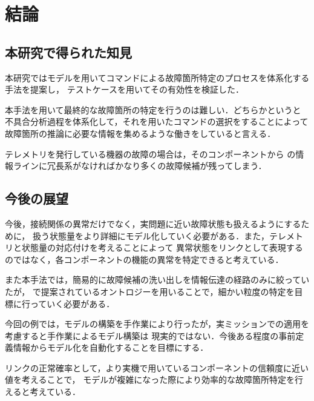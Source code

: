 \documentclass[11pt]{jsreport}
\begin{document}
\fi

\chapter{結論}

\section{本研究で得られた知見}%
本研究ではモデルを用いてコマンドによる故障箇所特定のプロセスを体系化する手法を提案し，
テストケースを用いてその有効性を検証した．

  本手法を用いて最終的な故障箇所の特定を行うのは難しい．どちらかというと
  不具合分析過程を体系化して，それを用いたコマンドの選択をすることによって
  故障箇所の推論に必要な情報を集めるような働きをしていると言える．

  テレメトリを発行している機器の故障の場合は，そのコンポーネントから
  の情報ラインに冗長系がなければかなり多くの故障候補が残ってしまう．

  \section{今後の展望}
 今後，接続関係の異常だけでなく，実問題に近い故障状態も扱えるようにするために，
 扱う状態量をより詳細にモデル化していく必要がある．また，テレメトリと状態量の対応付けを考えることによって
 異常状態をリンクとして表現するのではなく，各コンポーネントの機能の異常を特定できると考えている．

 また本手法では，簡易的に故障候補の洗い出しを情報伝達の経路のみに絞っていたが，
 \cite{}で提案されているオントロジーを用いることで，細かい粒度の特定を目標に行っていく必要がある．

 今回の例では，モデルの構築を手作業により行ったが，実ミッションでの適用を考慮すると手作業によるモデル構築は
 現実的ではない．今後ある程度の事前定義情報からモデル化を自動化することを目標にする．
  
 リンクの正常確率として，より実機で用いているコンポーネントの信頼度に近い値を考えることで，
 モデルが複雑になった際により効率的な故障箇所特定を行えると考えている．


\end{document}
